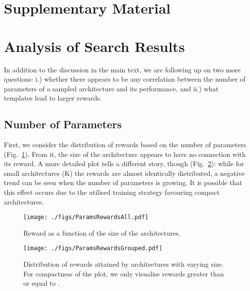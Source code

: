 \documentclass[10pt,twocolumn,letterpaper]{article}
\begin{document}
\clearpage
{\small
	
	
}


 \clearpage
 
 \section*{Supplementary Material}
 
 \section{Analysis of Search Results}
 In addition to the discussion in the main text, we are following up on two more questions: i.) whether there appears to be any correlation between the number of parameters of a sampled architecture and its performance, and ii.) what templates lead to larger rewards.
 
 
 \subsection*{Number of Parameters}
 
 First, we consider the distribution of rewards based on the number of parameters (Fig.~\ref{fig:rew-all}). From it, the size of the architecture appears to have no connection with its reward. A more detailed plot tells a different story, though (Fig.~\ref{fig:rew-grouped}): while for small architectures (K) the rewards are almost identically distributed, a negative trend can be seen when the number of parameters is growing. It is possible that this effect occurs due to the utilised training strategy favouring compact architectures. 
 \begin{figure}[thb]
 	\begin{center}
 		\texttt{[image: ./figs/ParamsRewardsAll.pdf]}
 	\end{center}
 	\caption{Reward as a function of the size of the architectures.\label{fig:rew-all}}
 \end{figure}
 
 
 \begin{figure}[thb]
 	\begin{center}
 		\texttt{[image: ./figs/ParamsRewardsGrouped.pdf]}
 	\end{center}
 	\caption{
 		Distribution of rewards attained by architectures with varying size. For compactness of the plot, we only visualise rewards greater than or equal to .\label{fig:rew-grouped}}
 \end{figure}
 
\end{document}
